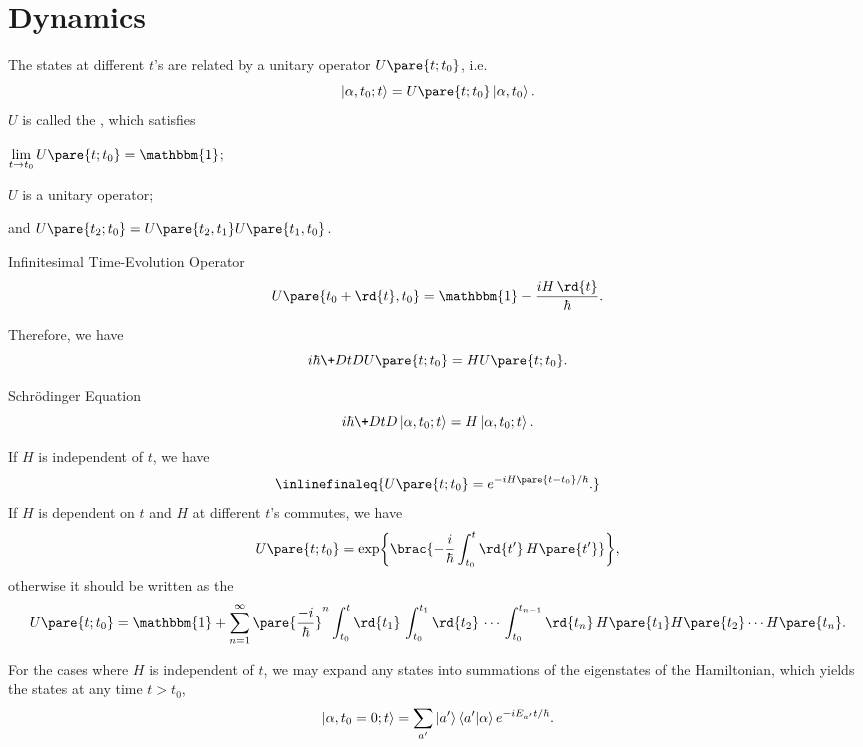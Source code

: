 \documentclass[hidelinks]{article}
\begin{document}
\section{Dynamics} %
\label{sec:dynamics}

\label{sub:time_evolution_and_the_schrodinger_equation}

\label{ssub:the_schrodinger_equation}

The states at different $t$'s are related by a unitary operator $U\pare{t;t_0}$, i.e.
\[ \ket{\alpha,t_0;t} = U\pare{t;t_0}\ket{\alpha,t_0}. \]
$U$ is called the , which satisfies
\begin{cenum}
    \item $\displaystyle \lim_{t\rightarrow t_0} U\pare{t;t_0} = \mathbbm{1}$;
    \item $U$ is a unitary operator;
    \item and $U\pare{t_2;t_0} = U\pare{t_2,t_1}U\pare{t_1,t_0}$.
\end{cenum}
\begin{finaleq}{Infinitesimal Time-Evolution Operator}
    \[ U\pare{t_0 + \rd{t}, t_0} = \mathbbm{1} - \frac{iH\,\rd{t}}{\hbar}. \]
\end{finaleq}
Therefore, we have
\[ i\hbar \+DtD{} U\pare{t;t_0} = HU\pare{t;t_0}. \]
\vspace{-\baselineskip}
\begin{finaleq}{Schr\"odinger Equation}
    \[ i\hbar \+DtD{} \ket{\alpha,t_0;t} = H\ket{\alpha,t_0;t}. \]
\end{finaleq}
If $H$ is independent of $t$, we have
\[ \inlinefinaleq{U\pare{t;t_0} = e^{-iH\pare{t-t_0}/\hbar}.} \]
If $H$ is dependent on $t$ and $H$ at different $t$'s commutes, we have
\[ U\pare{t;t_0} = \exp\brac{-\frac{i}{\hbar} \int_{t_0}^t \rd{t'}\, H\pare{t'}}, \]
otherwise it should be written as the 
\[ U\pare{t;t_0} = \mathbbm{1} + \sum_{n=1}^\infty \pare{\frac{-i}{\hbar}}^n \int_{t_0}^t \rd{t_1}\,\int_{t_0}^{t_1}\rd{t_2}\,\cdots \, \int_{t_0}^{t_{n-1}}\rd{t_n} \, H\pare{t_1}H\pare{t_2}\cdots H\pare{t_n}. \]
\par
For the cases where $H$ is independent of $t$, we may expand any states into summations of the eigenstates of the Hamiltonian, which yields the states at any time $t>t_0$,
\[ \ket{\alpha,t_0=0;t} = \sum_{a'} \ket{a'}\bra{a'}\ket{\alpha} e^{-iE_{a'}t/\hbar}. \]
\end{document}
